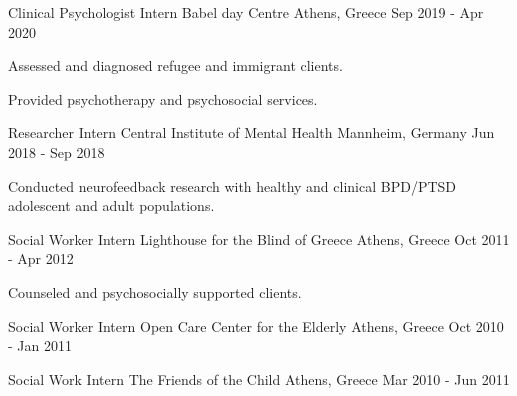 

\begin{cventries}

\cventry
{Clinical Psychologist Intern} %
{Babel day Centre} %
{Athens, Greece} %
{Sep 2019 - Apr 2020} %
{
\begin{cvitems} %
\item {
Assessed and diagnosed refugee and immigrant clients.
}
\item {
Provided psychotherapy and psychosocial services.
}
\end{cvitems}
}

\cventry
{Researcher Intern} %
{Central Institute of Mental Health} %
{Mannheim, Germany} %
{Jun 2018 - Sep 2018} %
{
\begin{cvitems} %
\item {Conducted neurofeedback research with healthy and clinical BPD/PTSD adolescent and adult populations.}
\end{cvitems}
}

\cventry
{Social Worker Intern} %
{Lighthouse for the Blind of Greece} %
{Athens, Greece} %
{Oct 2011 - Apr 2012} %
{
\begin{cvitems} %
\item {Counseled and psychosocially supported clients.}
\end{cvitems}
}

\cventry
{Social Worker Intern} %
{Open Care Center for the Elderly} %
{Athens, Greece} %
{Oct 2010 - Jan 2011} %
{}

\vspace{-2mm}
\cventry
{Social Work Intern} %
{The Friends of the Child} %
{Athens, Greece} %
{Mar 2010 - Jun 2011} %
{}
\vspace{-2mm}
\end{cventries}
